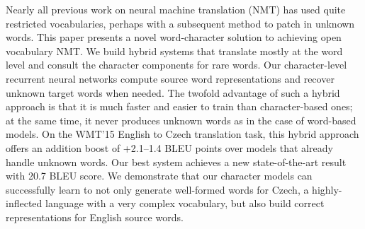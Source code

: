 Nearly all previous work on neural machine translation (NMT) has used quite restricted vocabularies, perhaps with a subsequent method to patch in unknown words. This paper presents a novel word-character solution to achieving open vocabulary NMT. We build hybrid systems that translate mostly at the word level and consult the character components for rare words. Our character-level recurrent neural networks compute source word representations and recover unknown target words when needed. The twofold advantage of such a hybrid approach is that it is much faster and easier to train than character-based ones; at the same time, it never produces unknown words as in the case of word-based models. On the WMT'15 English to Czech translation task, this hybrid approach offers an addition boost of +2.1--1.4 BLEU points over models that already handle unknown words. Our best system achieves a new state-of-the-art result with 20.7 BLEU score. We demonstrate that our character models can successfully learn to not only generate well-formed words for Czech, a highly-inflected language with a very complex vocabulary, but also build correct representations for English source words.
